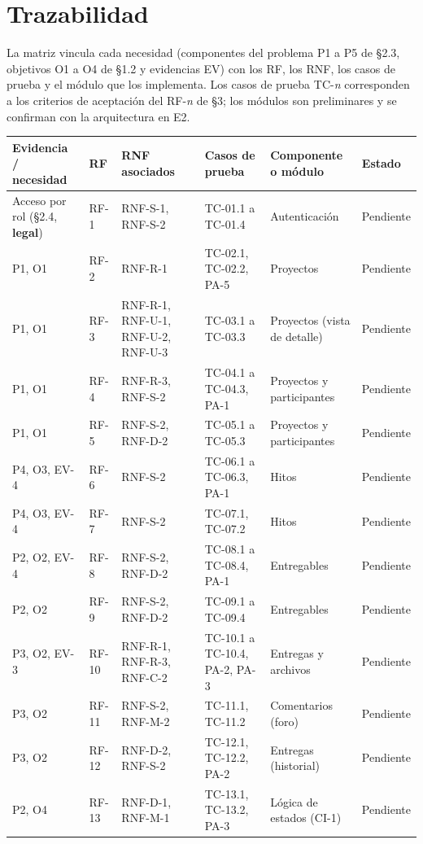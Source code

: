 \documentclass[10pt,a4paper]{article}
\newcommand{\hrow}{\rowcolor{encabezado}}
\newcommand{\h}[1]{\textbf{#1}}
\begin{document}
\section{Trazabilidad}
La matriz vincula cada necesidad (componentes del problema P1 a P5 de §2.3, objetivos O1 a O4 de §1.2 y evidencias EV) con los RF, los RNF, los casos de prueba y el módulo que los implementa. Los casos de prueba TC-\emph{n} corresponden a los criterios de aceptación del RF-\emph{n} de §3; los módulos son preliminares y se confirman con la arquitectura en E2.

\begin{xltabular}{\linewidth}{|P{2.4cm}|P{1.2cm}|P{2.6cm}|P{2.2cm}|L|P{1.6cm}|}
\hline\hrow \h{Evidencia / necesidad} & \h{RF} & \h{RNF asociados} & \h{Casos de prueba} & \h{Componente o módulo} & \h{Estado} \\ \hline
\endhead
Acceso por rol (§2.4, \textbf{legal}) & RF-1 & RNF-S-1, RNF-S-2 & TC-01.1 a TC-01.4 & Autenticación & Pendiente \\ \hline
P1, O1 & RF-2 & RNF-R-1 & TC-02.1, TC-02.2, PA-5 & Proyectos & Pendiente \\ \hline
P1, O1 & RF-3 & RNF-R-1, RNF-U-1, RNF-U-2, RNF-U-3 & TC-03.1 a TC-03.3 & Proyectos (vista de detalle) & Pendiente \\ \hline
P1, O1 & RF-4 & RNF-R-3, RNF-S-2 & TC-04.1 a TC-04.3, PA-1 & Proyectos y participantes & Pendiente \\ \hline
P1, O1 & RF-5 & RNF-S-2, RNF-D-2 & TC-05.1 a TC-05.3 & Proyectos y participantes & Pendiente \\ \hline
P4, O3, EV-4 & RF-6 & RNF-S-2 & TC-06.1 a TC-06.3, PA-1 & Hitos & Pendiente \\ \hline
P4, O3, EV-4 & RF-7 & RNF-S-2 & TC-07.1, TC-07.2 & Hitos & Pendiente \\ \hline
P2, O2, EV-4 & RF-8 & RNF-S-2, RNF-D-2 & TC-08.1 a TC-08.4, PA-1 & Entregables & Pendiente \\ \hline
P2, O2 & RF-9 & RNF-S-2, RNF-D-2 & TC-09.1 a TC-09.4 & Entregables & Pendiente \\ \hline
P3, O2, EV-3 & RF-10 & RNF-R-1, RNF-R-3, RNF-C-2 & TC-10.1 a TC-10.4, PA-2, PA-3 & Entregas y archivos & Pendiente \\ \hline
P3, O2 & RF-11 & RNF-S-2, RNF-M-2 & TC-11.1, TC-11.2 & Comentarios (foro) & Pendiente \\ \hline
P3, O2 & RF-12 & RNF-D-2, RNF-S-2 & TC-12.1, TC-12.2, PA-2 & Entregas (historial) & Pendiente \\ \hline
P2, O4 & RF-13 & RNF-D-1, RNF-M-1 & TC-13.1, TC-13.2, PA-3 & Lógica de estados (CI-1) & Pendiente \\ \hline

\end{xltabular}
\end{document}
